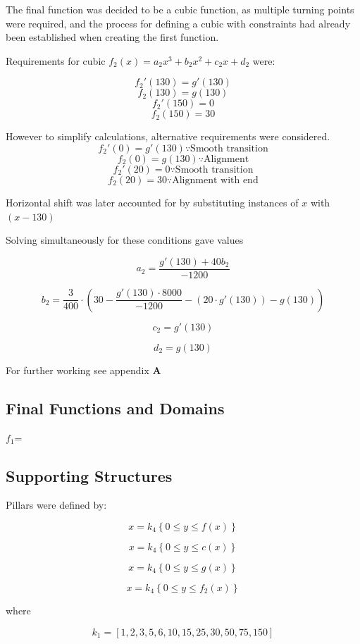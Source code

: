 \documentclass[11pt, letterpaper]{article}
\begin{document}
The final function was decided to be a cubic function, as multiple turning points were required, and the process for defining a cubic with constraints had already been established when creating the first function. 
	

Requirements for cubic $f_2(x)=a_2x^3+b_2x^2+c_2x+d_2$ were:

$$f_2'(130)=g'(130)$$
$$f_2(130)=g(130)$$
$$f_2'(150)=0$$
$$f_2(150)=30$$
	
However to simplify calculations, alternative requirements were considered.
$$f_2'(0)=g'(130)\because \textrm{Smooth transition}$$
$$f_2(0)=g(130)\because \textrm{Alignment}$$
$$f_2'(20)=0\because\textrm{Smooth transition}$$
$$f_2(20)=30\because\textrm{Alignment with end} $$

Horizontal shift was later accounted for by substituting instances of $x$ with $(x-130)$
	

Solving simultaneously for these conditions gave values 
	
	$$a_{2}=\frac{g'\left(130\right)+40b_{2}}{-1200}$$
	
	$$b_{2}=\frac{3}{400}\cdot\left(30-\frac{g'\left(130\right)\cdot8000}{-1200}-\left(20\cdot g'\left(130\right)\right)-g\left(130\right)\right)$$
	
	$$c_{2}=g'\left(130\right)$$
	
	$$d_{2}=g\left(130\right)$$

For further working see appendix $\mathbf{A}$
	


\subsection{Final Functions and Domains}

$f_1$=


\subsection{Supporting Structures}
Pillars were defined by:

$$x=k_{4}\left\{0\le y\le f\left(x\right)\right\}$$

$$x=k_{4}\left\{0\le y\le c\left(x\right)\right\}$$

$$x=k_{4}\left\{0\le y\le g\left(x\right)\right\}$$

$$x=k_{4}\left\{0\le y\le f_{2}\left(x\right)\right\}$$

where

$$k_{1}=\left[1,2,3,5,6,10,15,25,30,50,75,150\right]$$
\end{document}
